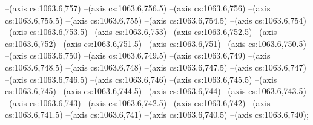 --(axis cs:1063.6,757)
--(axis cs:1063.6,756.5)
--(axis cs:1063.6,756)
--(axis cs:1063.6,755.5)
--(axis cs:1063.6,755)
--(axis cs:1063.6,754.5)
--(axis cs:1063.6,754)
--(axis cs:1063.6,753.5)
--(axis cs:1063.6,753)
--(axis cs:1063.6,752.5)
--(axis cs:1063.6,752)
--(axis cs:1063.6,751.5)
--(axis cs:1063.6,751)
--(axis cs:1063.6,750.5)
--(axis cs:1063.6,750)
--(axis cs:1063.6,749.5)
--(axis cs:1063.6,749)
--(axis cs:1063.6,748.5)
--(axis cs:1063.6,748)
--(axis cs:1063.6,747.5)
--(axis cs:1063.6,747)
--(axis cs:1063.6,746.5)
--(axis cs:1063.6,746)
--(axis cs:1063.6,745.5)
--(axis cs:1063.6,745)
--(axis cs:1063.6,744.5)
--(axis cs:1063.6,744)
--(axis cs:1063.6,743.5)
--(axis cs:1063.6,743)
--(axis cs:1063.6,742.5)
--(axis cs:1063.6,742)
--(axis cs:1063.6,741.5)
--(axis cs:1063.6,741)
--(axis cs:1063.6,740.5)
--(axis cs:1063.6,740);

